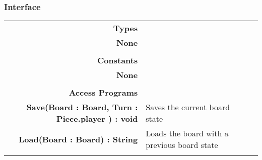 \documentclass[10pt]{article}
\begin{document}
    \subsubsection{Interface}
        \begin{tabularx}{\linewidth}{@{} >{\bfseries}r Xp{5cm} }
            Types           & \begin{tabular}[t]{@{} l p{8cm}} 
                                     & \\
                                    None & \\
                              \end{tabular} \\
                              
            Constants       & \begin{tabular}[t]{@{} l p{8cm}} 
                                     & \\
                                    None & \\
                              \end{tabular} \\

            Access Programs & \begin{tabular}[t]{@{} l p{8cm}}
                                     & \\
                                    Save(Board : Board, Turn : Piece.player ) : void & Saves the current board state \\
                                    Load(Board : Board) : String & Loads the board with a previous board state \\ 
                              \end{tabular}
        \end{tabularx}
        
\end{document}
